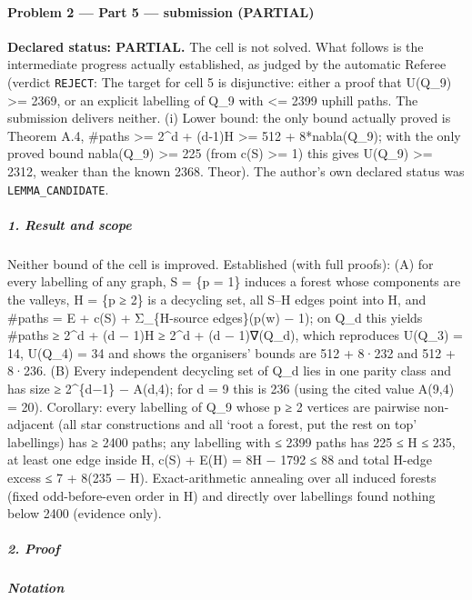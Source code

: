 \documentclass[11pt,a4paper]{article}
\begin{document}
\paragraph{Problem 2 --- Part 5 --- submission
(PARTIAL)}\label{problem-2-part-5-submission-partial}

\textbf{Declared status: PARTIAL.} The cell is not solved. What follows
is the intermediate progress actually established, as judged by the
automatic Referee (verdict \texttt{REJECT}: The target for cell 5 is
disjunctive: either a proof that U(Q\_9) \textgreater= 2369, or an
explicit labelling of Q\_9 with \textless= 2399 uphill paths. The
submission delivers neither. (i) Lower bound: the only bound actually
proved is Theorem A.4, \#paths \textgreater= 2\^{}d +
(d-1)\textbar H\textbar{} \textgreater= 512 + 8*nabla(Q\_9); with the
only proved bound nabla(Q\_9) \textgreater= 225 (from c(S) \textgreater=
1) this gives U(Q\_9) \textgreater= 2312, weaker than the known 2368.
Theor). The author's own declared status was \texttt{LEMMA\_CANDIDATE}.

\subparagraph{1. Result and scope}\label{result-and-scope}

Neither bound of the cell is improved. Established (with full proofs):
(A) for every labelling of any graph, S = \{p = 1\} induces a forest
whose components are the valleys, H = \{p ≥ 2\} is a decycling set, all
S--H edges point into H, and \#paths = \textbar E\textbar{} + c(S) +
Σ\_\{H-source edges\}(p(w) − 1); on Q\_d this yields \#paths ≥ 2\^{}d +
(d − 1)\textbar H\textbar{} ≥ 2\^{}d + (d − 1)∇(Q\_d), which reproduces
U(Q\_3) = 14, U(Q\_4) = 34 and shows the organisers' bounds are 512 +
8·232 and 512 + 8·236. (B) Every independent decycling set of Q\_d lies
in one parity class and has size ≥ 2\^{}\{d−1\} − A(d,4); for d = 9 this
is 236 (using the cited value A(9,4) = 20). Corollary: every labelling
of Q\_9 whose p ≥ 2 vertices are pairwise non-adjacent (all star
constructions and all `root a forest, put the rest on top' labellings)
has ≥ 2400 paths; any labelling with ≤ 2399 paths has 225 ≤
\textbar H\textbar{} ≤ 235, at least one edge inside H, c(S) +
\textbar E(H)\textbar{} = 8\textbar H\textbar{} − 1792 ≤ 88 and total
H-edge excess ≤ 7 + 8(235 − \textbar H\textbar). Exact-arithmetic
annealing over all induced forests (fixed odd-before-even order in H)
and directly over labellings found nothing below 2400 (evidence only).

\subparagraph{2. Proof}\label{proof}

\subparagraph{Notation}\label{notation}
\end{document}
